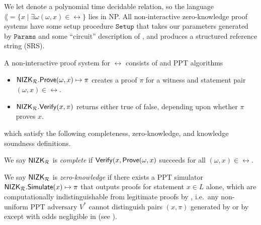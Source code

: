 % 

We let \rel denote a polynomial time decidable relation, so the language
 $\lang = \{x \mid \exists \omega (\omega,x) \in \rel \}$ lies in NP.
All non-interactive zero-knowledge proof systems have some setup procedure $\mathtt{Setup}$ that takes our parameters generated by $\mathtt{Params}$ and some ``circuit'' description of \rel, and produces a structured reference string (SRS).

A non-interactive proof system for $\rel$ consists of \Prove and \Verify PPT algorithms
\begin{itemize}
\item ${\mathsf{NIZK}}_\mathcal{R}.{\mathsf{Prove}}(\omega, x) \mapsto \pi$ creates a proof $\pi$ for a witness and statement pair $(\omega,x) \in \rel$.
\item ${\mathsf{NIZK}}_\mathcal{R}.{\mathsf{Verify}}(x, \pi)$ returns either true of false, depending upon whether $\pi$  proves $x$.
\end{itemize}	
which satisfy the following completeness, zero-knowledge, and knowledge soundness definitions.

\begin{definition}\label{def:nizk_completeness}
We say ${\mathsf{NIZK}}_\mathcal{R}$ is {\em complete} if ${\mathsf{Verify}}(x, {\mathsf{Prove}}(\omega,x)$ succeeds for all $(\omega,x) \in \rel$.  %
\end{definition}

\def\advV{\ensuremath{V^*}\xspace} %

\begin{definition}\label{def:nizk_zero_knowledge}
We say ${\mathsf{NIZK}}_\mathcal{R}$ is {\em zero-knowledge} if
there exists a PPT simulator ${\mathsf{NIZK}}_\mathcal{R}.{\mathsf{Simulate}}(x) \mapsto \pi$
that outputs proofs for statement $x \in L$ alone, which are
computationally indistinguishable from legitimate proofs by \Prove,
i.e.\ any non-uniform PPT adversary \advV cannot distinguish pairs $(x,\pi)$
generated by \Simulate or by \Prove except with odds negligible in \secparam
(see \cite[Def. 9, \S A, pap. 29]{RandomizationGroth16}). %
\end{definition}

